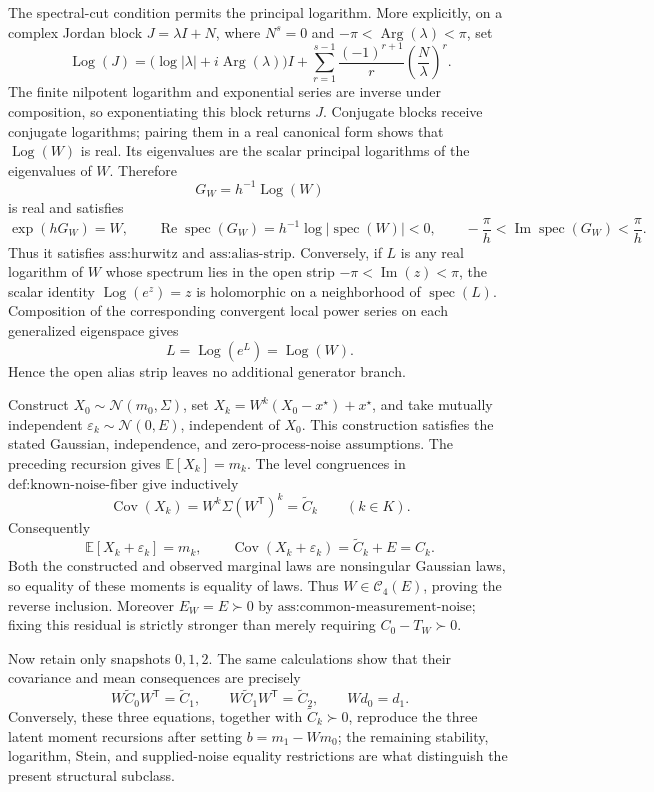 The spectral-cut condition permits the principal logarithm.  More explicitly, on a complex Jordan block \(J=\lambda I+N\), where \(N^s=0\) and \(-\pi<\operatorname{Arg}(\lambda)<\pi\), set
\[
 \operatorname{Log}(J)
 =\bigl(\log|\lambda|+i\operatorname{Arg}(\lambda)\bigr)I
 +\sum_{r=1}^{s-1}\frac{(-1)^{r+1}}{r}\left(\frac{N}{\lambda}\right)^r.
\]
The finite nilpotent logarithm and exponential series are inverse under composition, so exponentiating this block returns \(J\).  Conjugate blocks receive conjugate logarithms; pairing them in a real canonical form shows that \(\operatorname{Log}(W)\) is real.  Its eigenvalues are the scalar principal logarithms of the eigenvalues of \(W\).  Therefore
\[
 G_W=h^{-1}\operatorname{Log}(W)
\]
is real and satisfies
\[
 \exp(hG_W)=W,
 \qquad
 \operatorname{Re}\operatorname{spec}(G_W)
 =h^{-1}\log|\operatorname{spec}(W)|<0,
 \qquad
 -\frac{\pi}{h}<\operatorname{Im}\operatorname{spec}(G_W)<\frac{\pi}{h}.
\]
Thus it satisfies \(\text{ass:hurwitz}\) and \(\text{ass:alias-strip}\).  Conversely, if \(L\) is any real logarithm of \(W\) whose spectrum lies in the open strip \(-\pi<\operatorname{Im}(z)<\pi\), the scalar identity \(\operatorname{Log}(e^z)=z\) is holomorphic on a neighborhood of \(\operatorname{spec}(L)\).  Composition of the corresponding convergent local power series on each generalized eigenspace gives
\[
 L=\operatorname{Log}(e^L)=\operatorname{Log}(W).
\]
Hence the open alias strip leaves no additional generator branch.

Construct \(X_0\sim\mathcal N(m_0,\Sigma)\), set \(X_k=W^k(X_0-x^\star)+x^\star\), and take mutually independent \(\varepsilon_k\sim\mathcal N(0,E)\), independent of \(X_0\).  This construction satisfies the stated Gaussian, independence, and zero-process-noise assumptions.  The preceding recursion gives \(\mathbb E[X_k]=m_k\).  The level congruences in \(\text{def:known-noise-fiber}\) give inductively
\[
 \operatorname{Cov}(X_k)
 =W^k\Sigma(W^{\mathsf T})^k
 =\widetilde C_k
 \qquad(k\in K).
\]
Consequently
\[
 \mathbb E[X_k+\varepsilon_k]=m_k,
 \qquad
 \operatorname{Cov}(X_k+\varepsilon_k)=\widetilde C_k+E=C_k.
\]
Both the constructed and observed marginal laws are nonsingular Gaussian laws, so equality of these moments is equality of laws.  Thus \(W\in\mathcal C_4(E)\), proving the reverse inclusion.  Moreover \(E_W=E\succ0\) by \(\text{ass:common-measurement-noise}\); fixing this residual is strictly stronger than merely requiring \(C_0-T_W\succ0\).

Now retain only snapshots \(0,1,2\).  The same calculations show that their covariance and mean consequences are precisely
\[
 W\widetilde C_0W^{\mathsf T}=\widetilde C_1,
 \qquad
 W\widetilde C_1W^{\mathsf T}=\widetilde C_2,
 \qquad
 Wd_0=d_1.
\]
Conversely, these three equations, together with \(\widetilde C_k\succ0\), reproduce the three latent moment recursions after setting \(b=m_1-Wm_0\); the remaining stability, logarithm, Stein, and supplied-noise equality restrictions are what distinguish the present structural subclass.

